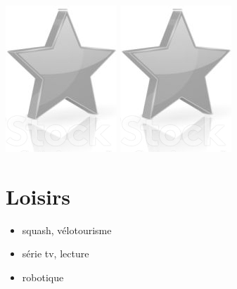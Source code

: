 \documentclass[10pt,a4paper,sans]{article}
\begin{document}
\begin{minipage}[t]{0.26\textwidth}
\begin{mdframed}[style=cadreCompetences]
\begin{itemize}
{                    \includegraphics[scale=0.20]{img/empty_star.png} \hspace{-0.2cm}
                    \includegraphics[scale=0.20]{img/empty_star.png}}
            \end{itemize}

        \section{Loisirs}
            \begin{itemize}
                \item{squash, vélotourisme}
                \item{série tv, lecture}
                \item{robotique}
            \end{itemize}
    \end{mdframed}
\end{minipage}
\hfill
\end{document}
